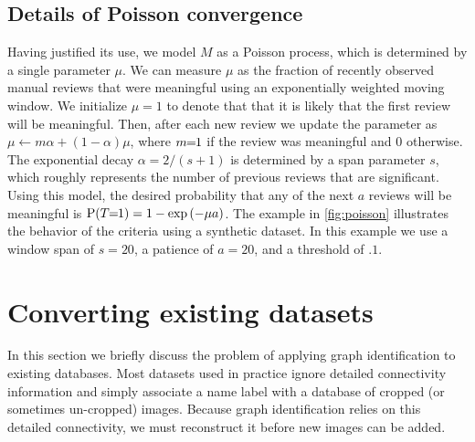 \subsection{Details of Poisson convergence}

Having justified its use, we model $M$ as a Poisson process, which is determined by a single parameter $\mu$.
We can measure $\mu$ as the fraction of recently observed manual reviews that were meaningful using an
  exponentially weighted moving window.
We initialize $\mu=1$ to denote that that it is likely that the first review will be meaningful.
Then, after each new review we update the parameter as %
$\mu \leftarrow m \alpha + (1 - \alpha) \mu$, where $m\mkern-6mu=\mkern-6mu1$ if the review was meaningful and $0$ otherwise.
The exponential decay $\alpha = 2 / (s + 1)$ is determined by a span parameter $s$, which roughly represents the
  number of previous reviews that are significant.
Using this model, the desired probability that any of the next $a$ reviews will be meaningful is %
$\mathbin{\operatorname{P}}(T\mkern-6mu=\mkern-6mu1) = 1 - \textrm{exp}\left(-\mu  a\right)$.
The example in \cref{fig:poisson} illustrates the behavior of the criteria using a synthetic dataset.
In this example we use a window span of $s=20$, a patience of $a=20$, and a threshold of $.1$.

\poisson{}
  






\section{Converting existing datasets}\label{sec:rename}

In this section we briefly discuss the problem of applying graph identification to existing databases.
Most datasets used in practice ignore detailed connectivity information and simply associate a name label with a
  database of cropped (or sometimes un-cropped) images.
Because graph identification relies on this detailed connectivity, we must reconstruct it before new images can
  be added.


